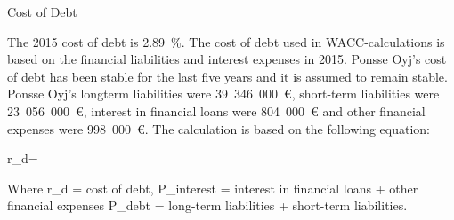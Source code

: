Cost of Debt

The 2015 cost of debt is 2.89~\%. The cost of debt used in WACC-calculations is based on the financial liabilities and interest expenses in 2015. Ponsse Oyj’s cost of debt has been stable for the last five years and it is assumed to remain stable. Ponsse Oyj’s longterm liabilities were 39~346~000~€, short-term liabilities were 23~056~000~€, interest in financial loans were 804~000~€ and other financial expenses were 998~000~€. The calculation is based on the following equation:

r_{d}=

Where r_{d} = cost of debt,  
P_{interest} = interest in financial loans + other financial expenses 
P_{debt} = long-term liabilities + short-term liabilities.
